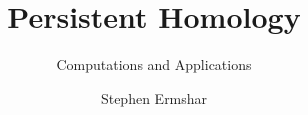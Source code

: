 \documentclass{beamer}
\title{Persistent Homology}
\subtitle{Computations and Applications}
\author{Stephen Ermshar}
\institute{Walla Walla University}
\begin{document}
\begin{frame}
    \titlepage
\end{frame}
\end{document}

